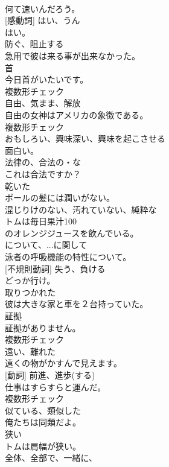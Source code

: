 \documentclass[8pt]{extreport}
\begin{document}
\begin{CJK}{UTF8}{min}
\\	何て速いんだろう。	
\\	[副詞] [感動詞]	はい、うん	
\\	はい。	
\\	[動詞]	防ぐ、阻止する	
\\	急用で彼は来る事が出来なかった。	
\\	[名詞]	首	
\\	今日首がいたいです。	
\\	複数形チェック
\\	[名詞]	自由、気まま、解放	
\\	自由の女神はアメリカの象徴である。	
\\	複数形チェック
\\	[形容詞]	おもしろい、興味深い、興味を起こさせる	
\\	面白い。	
\\	[形容詞]	法律の、合法の・な	
\\	これは合法ですか？	
\\	[形容詞]	乾いた	
\\	ポールの髪には潤いがない。	
\\	[形容詞]	混じりけのない、汚れていない、純粋な	
\\	トムは毎日果汁100
\\	のオレンジジュースを飲んでいる。	
\\	[前置詞]	について、...に関して	
\\	泳者の呼吸機能の特性について。	
\\	[動詞] [不規則動詞]	失う、負ける	
\\	どっか行け。	
\\	[形容詞]	取りつかれた	
\\	彼は大きな家と車を２台持っていた。	
\\	[名詞]	証拠	
\\	証拠がありません。	
\\	複数形チェック
\\	[形容詞]	遠い、離れた	
\\	遠くの物がかすんで見えます。	
\\	[名詞] [動詞]	前進、進歩(する)	
\\	仕事はすらすらと運んだ。	
\\	複数形チェック
\\	[形容詞]	似ている、類似した	
\\	俺たちは同類だよ。	
\\	[形容詞]	狭い	
\\	トムは肩幅が狭い。	
\\	[副詞]	全体、全部で、一緒に、	

\end{CJK}
\end{document}
